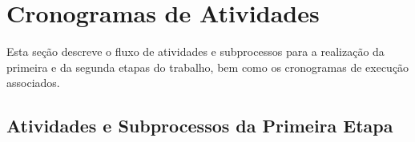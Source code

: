 \section{Cronogramas de Atividades}
\label{mtd-cronograma}

Esta seção descreve o fluxo de atividades e subprocessos para a realização da primeira e da segunda etapas do trabalho, bem como os cronogramas de execução associados.

\subsection{Atividades e Subprocessos da Primeira Etapa}
\label{met-atividades-primeira-etapa}

	



